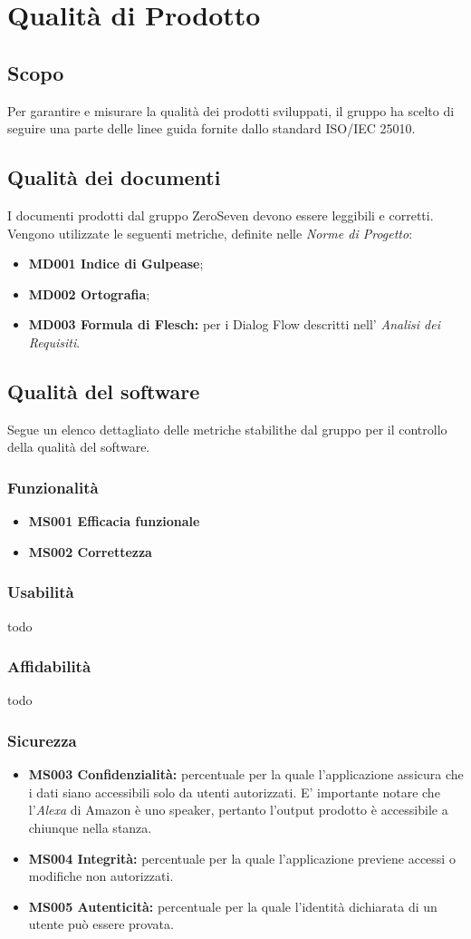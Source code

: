 \chapter{Qualità di Prodotto}
\section{Scopo}
Per garantire e misurare la qualità dei prodotti sviluppati, il gruppo ha scelto di seguire una parte delle linee guida fornite dallo standard ISO/IEC 25010.
\section{Qualità dei documenti}
I documenti prodotti dal gruppo ZeroSeven devono essere leggibili e corretti. Vengono utilizzate le seguenti metriche, definite nelle \textit{Norme di Progetto}:
\begin{itemize}
    \item \textbf{MD001 Indice di Gulpease};
    \item \textbf{MD002 Ortografia};
    \item \textbf{MD003 Formula di Flesch:} per i Dialog Flow descritti nell' \textit{Analisi dei Requisiti}.
\end{itemize}
\section{Qualità del software}
Segue un elenco dettagliato delle metriche stabilithe dal gruppo per il controllo della qualità del software.

\subsection{Funzionalità}
\begin{itemize}
	\item \textbf{MS001 Efficacia funzionale}
	\item \textbf{MS002 Correttezza}
\end{itemize}
\subsection{Usabilità}
todo
\subsection{Affidabilità}
todo
\subsection{Sicurezza}
\begin{itemize}
	\item \textbf{MS003 Confidenzialità:} percentuale per la quale l'applicazione assicura che i dati siano accessibili solo da utenti autorizzati. E' importante notare che l'\textit{Alexa} di Amazon è uno speaker, pertanto l'output prodotto è accessibile a chiunque nella stanza.
	\item \textbf{MS004 Integrità:} percentuale per la quale l'applicazione previene accessi o modifiche non autorizzati.
	\item \textbf{MS005 Autenticità:} percentuale per la quale l'identità dichiarata di un utente può essere provata.
\end{itemize}
